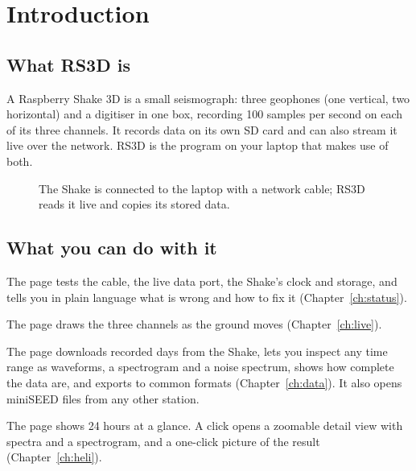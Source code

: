 \chapter{Introduction}\label{ch:intro}

\section{What RS3D is}
A Raspberry Shake 3D is a small seismograph: three geophones (one vertical, two horizontal) and a digitiser in one box,
recording 100 samples per second on each of its three channels. It records data on its own SD card and can also
stream it live over the network. RS3D is the program on your laptop that makes use of both.

\begin{figure}[tbp]
\centering
{}
\caption{The Shake is connected to the laptop with a network cable; RS3D reads it live and copies its stored data.}
\end{figure}

\section{What you can do with it}
\begin{description}[leftmargin=3cm,style=nextline]
\item[Check the Shake] The  page tests the cable, the live data port, the Shake's clock and storage, and tells you in plain
  language what is wrong and how to fix it (Chapter~\ref{ch:status}).
\item[Watch live] The  page draws the three channels as the ground moves (Chapter~\ref{ch:live}).
\item[Work with data] The  page downloads recorded days from the Shake, lets you inspect any time range as waveforms, a
  spectrogram and a noise spectrum, shows how complete the data are, and exports to common formats
  (Chapter~\ref{ch:data}). It also opens miniSEED files from any other station.
\item[See the whole day] The  page shows 24 hours at a glance. A click opens a zoomable detail view with spectra and
  a spectrogram, and a one-click picture of the result (Chapter~\ref{ch:heli}).
\end{description}

